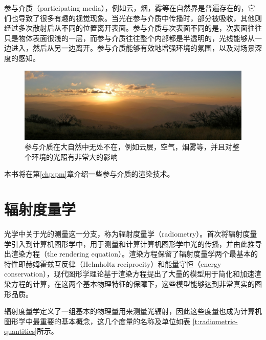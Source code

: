 参与介质（participating media），例如云，烟，雾等在自然界是普遍存在的，它们也导致了很多有趣的视觉现象。当光在参与介质中传播时，部分被吸收，其他则经过多次散射后从不同的位置离开表面。参与介质与次表面不同的是，次表面往往只是物体表面很浅的一层，而参与介质往往整个内部都是半透明的，光线能够从一边进入，然后从另一边离开。参与介质能够有效地增强环境的氛围，以及对场景深度的感知。

\begin{figure}
	\includegraphics[width=1.0\textwidth]{figures/intro/Participating-media}
	\caption{参与介质在大自然中无处不在，例如云层，空气，烟雾等，并且对整个环境的光照有非常大的影响}
	\label{f:intro-Participating-media}
\end{figure}

本书将在第\ref{chp:pm}章介绍一些参与介质的渲染技术。





\section{辐射度量学}
光学中关于光的测量这一分支，称为辐射度量学（radiometry）。\cite{a:TheRenderingEquation}首次将辐射度量学引入到计算机图形学中，用于测量和计算计算机图形学中光的传播，并由此推导出渲染方程（the rendering equation）。渲染方程保留了辐射度量学两个最基本的特性即赫姆霍兹互反律（Helmholtz reciprocity）和能量守恒（energy conservation），现代图形学理论基于渲染方程提出了大量的模型用于简化和加速渲染方程的计算，在这两个基本物理特征的保障下，这些模型能够达到非常真实的图形品质。

辐射度量学定义了一组基本的物理量用来测量光辐射，因此这些度量也成为计算机图形学中最重要的基本概念，这几个度量的名称及单位如表 \ref{t:radiometric-quantities}所示。


